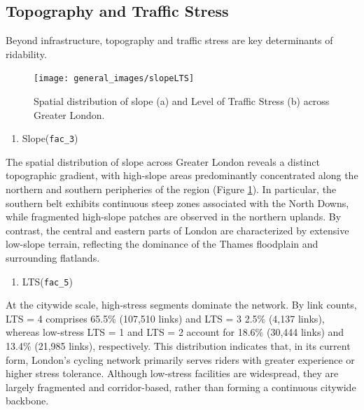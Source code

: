 \documentclass[
  12pt,
  oneside]{book}
\providecommand{\tightlist}{%
  \setlength{\itemsep}{0pt}\setlength{\parskip}{0pt}}
\begin{document}
\subsection{Topography and Traffic Stress}\label{topography-and-traffic-stress}

Beyond infrastructure, topography and traffic stress are key determinants of ridability.

\begin{figure}

{\centering \texttt{[image: general\_images/slopeLTS]} 

}

\caption{Spatial distribution of slope (a) and Level of Traffic Stress (b) across Greater London.}\label{fig:slopeLTS}
\end{figure}

\begin{enumerate}
\def\labelenumi{\arabic{enumi}.}
\tightlist
\item
  Slope(\texttt{fac\_3})
\end{enumerate}

The spatial distribution of slope across Greater London reveals a distinct topographic gradient, with high-slope areas predominantly concentrated along the northern and southern peripheries of the region (Figure \ref{fig:slopeLTS}). In particular, the southern belt exhibits continuous steep zones associated with the North Downs, while fragmented high-slope patches are observed in the northern uplands. By contrast, the central and eastern parts of London are characterized by extensive low-slope terrain, reflecting the dominance of the Thames floodplain and surrounding flatlands.

\begin{enumerate}
\def\labelenumi{\arabic{enumi}.}
\setcounter{enumi}{1}
\tightlist
\item
  LTS(\texttt{fac\_5})
\end{enumerate}

At the citywide scale, high-stress segments dominate the network. By link counts, LTS = 4 comprises 65.5\% (107,510 links) and LTS = 3 2.5\% (4,137 links), whereas low-stress LTS = 1 and LTS = 2 account for 18.6\% (30,444 links) and 13.4\% (21,985 links), respectively. This distribution indicates that, in its current form, London's cycling network primarily serves riders with greater experience or higher stress tolerance. Although low-stress facilities are widespread, they are largely fragmented and corridor-based, rather than forming a continuous citywide backbone.
\end{document}
